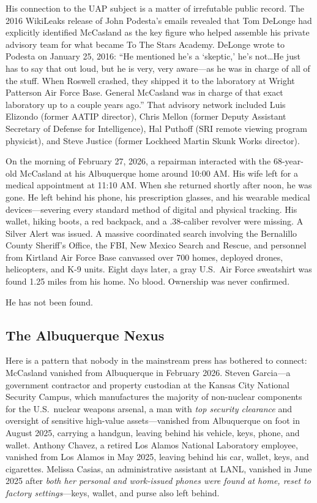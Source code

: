 \documentclass[11pt,a4paper]{article}
\begin{document}
His connection to the UAP subject is a matter of irrefutable public record. The 2016 WikiLeaks release of John Podesta's emails revealed that Tom DeLonge had explicitly identified McCasland as the key figure who helped assemble his private advisory team for what became To The Stars Academy. DeLonge wrote to Podesta on January 25, 2016: ``He mentioned he's a `skeptic,' he's not\ldots He just has to say that out loud, but he is very, very aware---as he was in charge of all of the stuff. When Roswell crashed, they shipped it to the laboratory at Wright Patterson Air Force Base. General McCasland was in charge of that exact laboratory up to a couple years ago.'' That advisory network included Luis Elizondo (former AATIP director), Chris Mellon (former Deputy Assistant Secretary of Defense for Intelligence), Hal Puthoff (SRI remote viewing program physicist), and Steve Justice (former Lockheed Martin Skunk Works director).

On the morning of February 27, 2026, a repairman interacted with the 68-year-old McCasland at his Albuquerque home around 10:00 AM. His wife left for a medical appointment at 11:10 AM. When she returned shortly after noon, he was gone. He left behind his phone, his prescription glasses, and his wearable medical devices---severing every standard method of digital and physical tracking. His wallet, hiking boots, a red backpack, and a .38-caliber revolver were missing. A Silver Alert was issued. A massive coordinated search involving the Bernalillo County Sheriff's Office, the FBI, New Mexico Search and Rescue, and personnel from Kirtland Air Force Base canvassed over 700 homes, deployed drones, helicopters, and K-9 units. Eight days later, a gray U.S.\ Air Force sweatshirt was found 1.25 miles from his home. No blood. Ownership was never confirmed.

He has not been found.

\subsection{The Albuquerque Nexus}

Here is a pattern that nobody in the mainstream press has bothered to connect: McCasland vanished from Albuquerque in February 2026. Steven Garcia---a government contractor and property custodian at the Kansas City National Security Campus, which manufactures the majority of non-nuclear components for the U.S.\ nuclear weapons arsenal, a man with \textit{top security clearance} and oversight of sensitive high-value assets---vanished from Albuquerque on foot in August 2025, carrying a handgun, leaving behind his vehicle, keys, phone, and wallet. Anthony Chavez, a retired Los Alamos National Laboratory employee, vanished from Los Alamos in May 2025, leaving behind his car, wallet, keys, and cigarettes. Melissa Casias, an administrative assistant at LANL, vanished in June 2025 after \textit{both her personal and work-issued phones were found at home, reset to factory settings}---keys, wallet, and purse also left behind.
\end{document}
